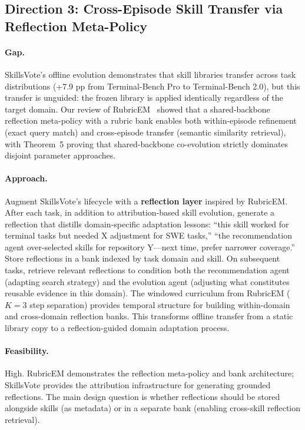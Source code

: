 \documentclass[11pt,a4paper]{article}
\begin{document}
\subsection{Direction 3: Cross-Episode Skill Transfer via Reflection Meta-Policy}

\paragraph{Gap.} SkillsVote's offline evolution demonstrates that skill libraries transfer across task distributions (+7.9 pp from Terminal-Bench Pro to Terminal-Bench 2.0), but this transfer is unguided: the frozen library is applied identically regardless of the target domain. Our review of RubricEM~\cite{rubricem} showed that a shared-backbone reflection meta-policy with a rubric bank enables both within-episode refinement (exact query match) and cross-episode transfer (semantic similarity retrieval), with Theorem~5 proving that shared-backbone co-evolution strictly dominates disjoint parameter approaches.

\paragraph{Approach.} Augment SkillsVote's lifecycle with a \textbf{reflection layer} inspired by RubricEM. After each task, in addition to attribution-based skill evolution, generate a reflection that distills domain-specific adaptation lessons: ``this skill worked for terminal tasks but needed X adjustment for SWE tasks,'' ``the recommendation agent over-selected skills for repository Y---next time, prefer narrower coverage.'' Store reflections in a bank indexed by task domain and skill. On subsequent tasks, retrieve relevant reflections to condition both the recommendation agent (adapting search strategy) and the evolution agent (adjusting what constitutes reusable evidence in this domain). The windowed curriculum from RubricEM ($K{=}3$ step separation) provides temporal structure for building within-domain and cross-domain reflection banks. This transforms offline transfer from a static library copy to a reflection-guided domain adaptation process.

\paragraph{Feasibility.} High. RubricEM demonstrates the reflection meta-policy and bank architecture; SkillsVote provides the attribution infrastructure for generating grounded reflections. The main design question is whether reflections should be stored alongside skills (as metadata) or in a separate bank (enabling cross-skill reflection retrieval).
\end{document}
